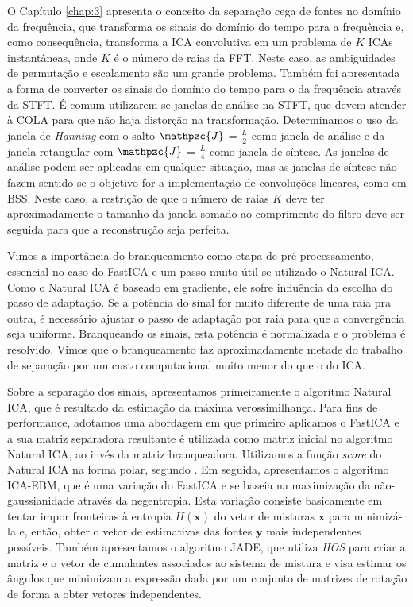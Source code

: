 O Capítulo \ref{chap:3} apresenta o conceito da separação cega de fontes no domínio da frequência, que transforma os sinais do domínio do tempo para a frequência e, como consequência, transforma a ICA convolutiva em um problema de $K$ ICAs instantâneas, onde ${K}$ é o número de raias da FFT. Neste caso, as ambiguidades de permutação e escalamento são um grande problema. Também foi apresentada a forma de converter os sinais do domínio do tempo para o da frequência através da STFT. É comum utilizarem-se janelas de análise na STFT, que devem atender à COLA para que não haja distorção na transformação. Determinamos o uso da janela de \textit{Hanning} com o salto $\mathpzc{J}$ = $\frac{L}{2}$ como janela de análise e da janela retangular com  $\mathpzc{J}$ = $\frac{L}{4}$ como janela de síntese. As janelas de análise podem ser aplicadas em qualquer situação, mas as janelas de síntese não fazem sentido se o objetivo for a implementação de convoluções lineares, como em BSS. Neste caso, a restrição de que o número de raias ${K}$ deve ter aproximadamente o tamanho da janela somado ao comprimento do filtro deve ser seguida para que a reconstrução seja perfeita. 

Vimos a importância do branqueamento como etapa de pré-processamento, essencial no caso do FastICA e um passo muito útil se utilizado o Natural ICA. Como o Natural ICA é baseado em gradiente, ele sofre influência da escolha do passo de adaptação. Se a potência do sinal for muito diferente de uma raia pra outra, é necessário ajustar o passo de adaptação por raia para que a convergência seja uniforme. Branqueando os sinais, esta potência é normalizada e o problema é resolvido. Vimos que o branqueamento faz aproximadamente metade do trabalho de separação por um custo computacional muito menor do que o do ICA.
 
Sobre a separação dos sinais, apresentamos primeiramente o algoritmo Natural ICA, que é resultado da estimação da máxima verossimilhança. Para fins de performance, adotamos uma abordagem em que primeiro aplicamos o FastICA e a sua matriz separadora resultante é utilizada como matriz inicial no algoritmo Natural ICA, ao invés da matriz branqueadora. Utilizamos a função \textit{score} do Natural ICA na forma polar, segundo \cite{LuizVictorio}. Em seguida, apresentamos o algoritmo ICA-EBM, que é uma variação do FastICA e se baseia na maximização da não-gaussianidade através da negentropia. Esta variação consiste basicamente em tentar impor fronteiras à entropia $H(\mathbf{x})$ do vetor de misturas $\mathbf{x}$ para minimizá-la e, então, obter o vetor de estimativas das fontes $\mathbf{y}$ mais independentes possíveis. Também apresentamos o algoritmo JADE, que utiliza \textit{HOS} para criar a matriz e o vetor de cumulantes associados ao sistema de mistura e visa estimar os ângulos que minimizam a expressão dada por um conjunto de matrizes de rotação de forma a obter vetores independentes.

